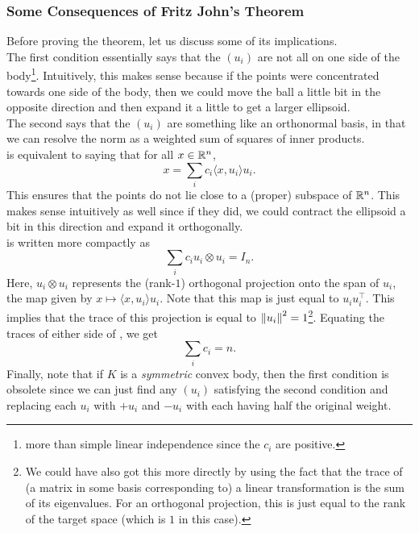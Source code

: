 \subsubsection{Some Consequences of Fritz John's Theorem}

Before proving the theorem, let us discuss some of its implications.\\

The first condition essentially says that the $(u_i)$ are not all on one side of the body\footnote{more than simple linear independence since the $c_i$ are positive.}. Intuitively, this makes sense because if the points were concentrated towards one side of the body, then we could move the ball a little bit in the opposite direction and then expand it a little to get a larger ellipsoid.\\
The second says that the $(u_i)$ are something like an orthonormal basis, in that we can resolve the norm as a weighted sum of squares of inner products.\\
 is equivalent to saying that for all $x\in\mathbb{R}^n$,
\[ x = \sum_i c_i \langle x,u_i\rangle u_i. \]
This ensures that the points do not lie close to a (proper) subspace of $\mathbb{R}^n$. This makes sense intuitively as well since if they did, we could contract the ellipsoid a bit in this direction and expand it orthogonally.\\

 is written more compactly as
\begin{equation}
\label{eqn orthogonal projection compact notation}
    \sum_i c_i u_i \otimes u_i = I_n.
\end{equation}
Here, $u_i\otimes u_i$ represents the (rank-$1$) orthogonal projection onto the span of $u_i$, the map given by $x\mapsto \langle x,u_i\rangle u_i$. Note that this map is just equal to $u_i u_i^\top$. This implies that the trace of this projection is equal to $\left\lVert u_i\right\rVert^2 = 1$\footnote{We could have also got this more directly by using the fact that the trace of (a matrix in some basis corresponding to) a linear transformation is the sum of its eigenvalues. For an orthogonal projection, this is just equal to the rank of the target space (which is $1$ in this case).}. Equating the traces of either side of , we get
\begin{equation}
\label{eqn sum of fritz john constants is n}
    \sum_i c_i = n.
\end{equation}
Finally, note that if $K$ is a \textit{symmetric} convex body, then the first condition is obsolete since we can just find any $(u_i)$ satisfying the second condition and replacing each $u_i$ with $+u_i$ and $-u_i$ with each having half the original weight.\\

